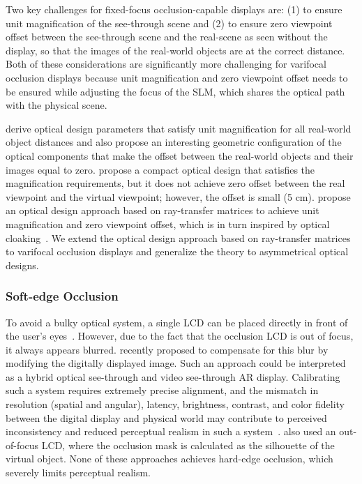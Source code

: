 Two key challenges for fixed-focus occlusion-capable displays are: (1) to ensure unit magnification of the see-through scene and (2) to ensure zero viewpoint offset between the see-through scene and the real-scene as seen without the display, so that the images of the real-world objects are at the correct distance. Both of these considerations are significantly more challenging for varifocal occlusion displays because unit magnification and zero viewpoint offset needs to be ensured while adjusting the focus of the SLM, which shares the optical path with the physical scene. 

\citet{Kiyokawa2003} derive optical design parameters that satisfy unit magnification for all real-world object distances and also propose an interesting geometric configuration of the optical components that make the offset between the real-world objects and their images equal to zero.
\citet{Cakmakci2004} propose a compact optical design that satisfies the magnification requirements, but it does not achieve zero offset between the real viewpoint and the virtual viewpoint; however, the offset is small (5 cm). 
\citet{Howlett2017} propose an optical design approach based on ray-transfer matrices to achieve unit magnification and zero viewpoint offset, which is in turn inspired by optical cloaking~\cite{Choi2015}.
We extend the optical design approach based on ray-transfer matrices to varifocal occlusion displays and generalize the theory to asymmetrical optical designs.  

\subsubsection{Soft-edge Occlusion} 

To avoid a bulky optical system, a single LCD can be placed directly in front of the user's eyes~\cite{Wetzstein2010,Itoh2017}. 
However, due to the fact that the occlusion LCD is out of focus, it always appears blurred. 
\citet{Itoh2017} recently proposed to compensate for this blur by modifying the digitally displayed image.
Such an approach could be interpreted as a hybrid optical see-through and video see-through AR display. 
Calibrating such a system requires extremely precise alignment, and the mismatch in resolution (spatial and angular), latency, brightness, contrast, and color fidelity between the digital display and physical world may contribute to perceived inconsistency and reduced perceptual realism in such a system~\cite{Rolland2000}. 
\citet{Maimone2014Pinlight} also used an out-of-focus LCD, where the occlusion mask is calculated as the silhouette of the virtual object. None of these approaches achieves hard-edge occlusion, which severely limits perceptual realism.


